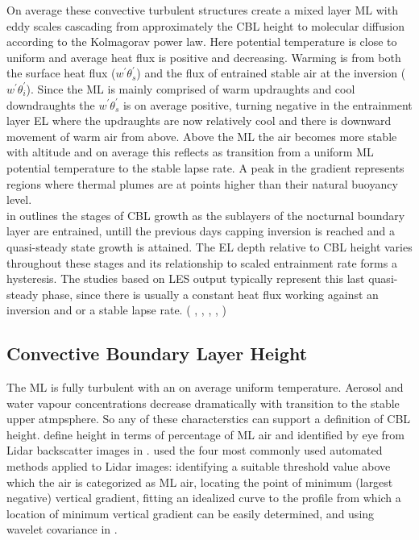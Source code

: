 On average these convective turbulent structures create a mixed layer \acs{ML} with eddy scales cascading from approximately the \acs{CBL} height 
to molecular diffusion according to the Kolmagorav power law.  Here potential temperature is close to uniform and average heat
flux is positive and decreasing. Warming is from both the surface heat flux ($w^{'}\theta^{'}_{s}$) and the flux of entrained stable air at the
 inversion ($w^{'}\theta^{'}_{i}$).  Since the \ac{ML} is mainly comprised of warm updraughts and cool downdraughts the $w^{'}\theta^{'}_{s}$ 
is on average positive, turning negative in the entrainment layer \acs{EL} where the updraughts are now relatively cool and there is downward
movement of warm air from above.  Above the \acs{ML} the air becomes more stable with altitude and on average this reflects as transition from
a uniform \acs{ML} potential temperature to the stable lapse rate.  A peak in the gradient represents regions where thermal plumes are at points 
higher than their natural buoyancy level. \\

\citeauthor{StullNelEl} in \cite{StullNelEl} outlines the stages of \acs{CBL} growth as the sublayers of the nocturnal
boundary layer are entrained, untill the previous days capping inversion is reached and a quasi-steady state growth 
is attained.  The \acs{EL} depth relative to \acs{CBL} height varies throughout these stages and its relationship
to scaled entrainment rate forms a hysteresis.  The studies based on LES output typically represent this last quasi-steady
phase, since there is usually a constant heat flux working against an inversion and or a stable lapse rate. 
(\citeauthor{SchmidtSchu} \cite{SchmidtSchu}, \citeauthor{Sorbjan} \cite{Sorbjan}, \citeauthor{SullMoengStev} \cite{SullMoengStev}, 
\citeauthor{FedConzMir04} \cite{FedConzMir04}, \citeauthor{BrooksFowler2} \cite{BrooksFowler2})  

\subsection{Convective Boundary Layer Height}
\label{subsec:}

The \acs{ML} is fully turbulent with an on average uniform temperature. Aerosol and water vapour concentrations 
decrease dramatically with transition to the stable upper atmpsphere.  So any of these characterstics can support
a definition of \acs{CBL} height.  \citeauthor{StullNelEl} define height in terms of percentage of \acs{ML} air
and identified by eye from Lidar backscatter images in \cite{StullNelEl}.  \citeauthor{Traum11} used
the four most commonly used automated methods applied to Lidar images: identifying a suitable threshold value 
above which the air is categorized as \acs{ML} air,  locating the point of minimum (largest negative) 
vertical gradient, fitting an idealized curve to the profile from which a location of minimum vertical
gradient can be easily determined, and using wavelet covariance in \cite{Traum11}.\\

